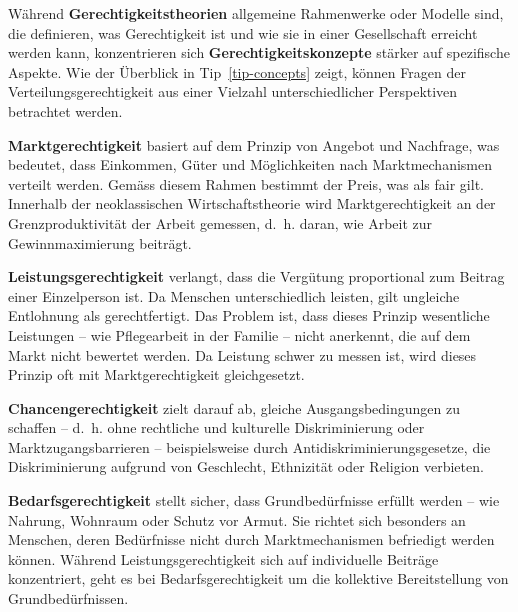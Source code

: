 \documentclass[
  nswissgerman,
  a4paper,
  DIV=11,
  numbers=noendperiod,
  oneside,
  openany]{scrreprt}
\newcounter{quartocallouttipno}
\newcommand{\quartocallouttip}[1]{\refstepcounter{quartocallouttipno}\label{#1}}
\begin{document}
Während \textbf{Gerechtigkeitstheorien} allgemeine Rahmenwerke oder
Modelle sind, die definieren, was Gerechtigkeit ist und wie sie in einer
Gesellschaft erreicht werden kann, konzentrieren sich
\textbf{Gerechtigkeitskonzepte} stärker auf spezifische Aspekte. Wie der
Überblick in Tip~\ref{tip-concepts} zeigt, können Fragen der
Verteilungsgerechtigkeit aus einer Vielzahl unterschiedlicher
Perspektiven betrachtet werden.

\begin{tcolorbox}[enhanced jigsaw, arc=.35mm, bottomrule=.15mm, bottomtitle=1mm, breakable, colback=white, colbacktitle=quarto-callout-note-color!10!white, colframe=quarto-callout-note-color-frame, coltitle=black, left=2mm, leftrule=.75mm, opacityback=0, opacitybacktitle=0.6, rightrule=.15mm, title={Hinweis \ref*{tip-concepts}: Normative Gerechtigkeitskonzepte nach
{[}@novyZukunftsfaehigesWirtschaften2023{]}}, titlerule=0mm, toprule=.15mm, toptitle=1mm]

\quartocallouttip{tip-concepts} 

\textbf{Marktgerechtigkeit} basiert auf dem Prinzip von Angebot und
Nachfrage, was bedeutet, dass Einkommen, Güter und Möglichkeiten nach
Marktmechanismen verteilt werden. Gemäss diesem Rahmen bestimmt der
Preis, was als fair gilt. Innerhalb der neoklassischen
Wirtschaftstheorie wird Marktgerechtigkeit an der Grenzproduktivität der
Arbeit gemessen, d.~h. daran, wie Arbeit zur Gewinnmaximierung beiträgt.

\textbf{Leistungsgerechtigkeit} verlangt, dass die Vergütung
proportional zum Beitrag einer Einzelperson ist. Da Menschen
unterschiedlich leisten, gilt ungleiche Entlohnung als gerechtfertigt.
Das Problem ist, dass dieses Prinzip wesentliche Leistungen -- wie
Pflegearbeit in der Familie -- nicht anerkennt, die auf dem Markt nicht
bewertet werden. Da Leistung schwer zu messen ist, wird dieses Prinzip
oft mit Marktgerechtigkeit gleichgesetzt.

\textbf{Chancengerechtigkeit} zielt darauf ab, gleiche
Ausgangsbedingungen zu schaffen -- d.~h. ohne rechtliche und kulturelle
Diskriminierung oder Marktzugangsbarrieren -- beispielsweise durch
Antidiskriminierungsgesetze, die Diskriminierung aufgrund von
Geschlecht, Ethnizität oder Religion verbieten.

\textbf{Bedarfsgerechtigkeit} stellt sicher, dass Grundbedürfnisse
erfüllt werden -- wie Nahrung, Wohnraum oder Schutz vor Armut. Sie
richtet sich besonders an Menschen, deren Bedürfnisse nicht durch
Marktmechanismen befriedigt werden können. Während
Leistungsgerechtigkeit sich auf individuelle Beiträge konzentriert, geht
es bei Bedarfsgerechtigkeit um die kollektive Bereitstellung von
Grundbedürfnissen.


\end{tcolorbox}
\end{document}
